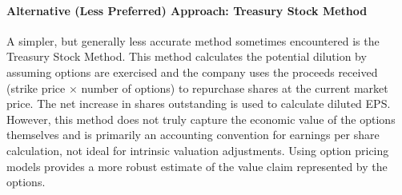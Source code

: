 \paragraph{Alternative (Less Preferred) Approach: Treasury Stock Method}
A simpler, but generally less accurate method sometimes encountered is the Treasury Stock Method. This method calculates the potential dilution by assuming options are exercised and the company uses the proceeds received (strike price \(\times\) number of options) to repurchase shares at the current market price. The net increase in shares outstanding is used to calculate diluted EPS. However, this method does not truly capture the economic value of the options themselves and is primarily an accounting convention for earnings per share calculation, not ideal for intrinsic valuation adjustments. Using option pricing models provides a more robust estimate of the value claim represented by the options.\\
